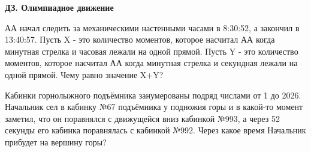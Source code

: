 \centerline{\bf \Huge ДЗ. Олимпиадное движение} 


 АА начал следить за механическими настенными часами в 8:30:52, а закончил в 13:40:57. Пусть X - это количество моментов, которое насчитал АА когда минутная стрелка и часовая лежали на одной прямой. Пусть Y - это количество моментов, которое насчитал АА когда минутная стрелка и секундная лежали на одной прямой. Чему равно значение X+Y?

  Кабинки горнолыжного подъёмника занумерованы подряд числами от 1 до 2026. Начальник сел в кабинку №67 подъёмника
у подножия горы и в какой-то момент заметил, что он поравнялся с движущейся вниз кабинкой №993, а через 52 секунды его кабинка поравнялась
с кабинкой №992. Через какое время Начальник прибудет на вершину горы?

